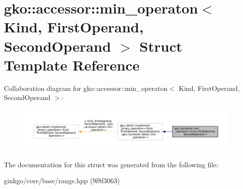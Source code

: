 \hypertarget{structgko_1_1accessor_1_1min__operaton}{}\section{gko\+:\+:accessor\+:\+:min\+\_\+operaton$<$ Kind, First\+Operand, Second\+Operand $>$ Struct Template Reference}
\label{structgko_1_1accessor_1_1min__operaton}


Collaboration diagram for gko\+:\+:accessor\+:\+:min\+\_\+operaton$<$ Kind, First\+Operand, Second\+Operand $>$\+:
\nopagebreak
\begin{figure}[H]
\begin{center}
\leavevmode
\includegraphics[width=350pt]{structgko_1_1accessor_1_1min__operaton__coll__graph}
\end{center}
\end{figure}


The documentation for this struct was generated from the following file\+:\begin{DoxyCompactItemize}
\item 
ginkgo/core/base/range.\+hpp (9f8f3063)\end{DoxyCompactItemize}
